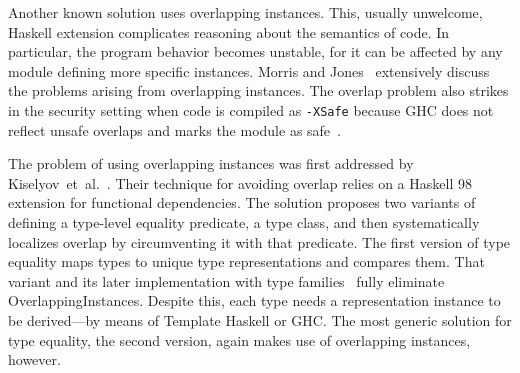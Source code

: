 \documentclass[runningheads]{llncs}
\newcommand{\K}[1]{\lstinline[style=fancy]{#1}}
\begin{document}
Another known solution uses overlapping instances. This, usually unwelcome, Haskell extension complicates reasoning about the semantics of code. In particular, the program behavior becomes unstable, for it can be affected by any module defining more specific instances. Morris and Jones~\cite{Morris2010} extensively discuss the problems arising from overlapping instances.
The overlap problem also strikes in the security setting when code is compiled as \K{-XSafe} because GHC does not reflect unsafe overlaps and marks the module as safe~\cite{sh-overlapping}.

The problem of using overlapping instances was first addressed by Kiselyov~et~al.~\cite{Kiselyov2004}. Their technique for avoiding overlap relies on a Haskell 98 extension for functional dependencies. The solution proposes two variants of defining a type-level equality predicate, a type class, and then systematically localizes overlap by circumventing it with that predicate. The first version of type equality maps types to unique type representations and compares them. That variant and its later implementation with type families~\cite{Kiselyov2012} fully eliminate \textsf{OverlappingInstances}. Despite this, each type needs a representation instance to be derived---by means of Template Haskell or GHC. The most generic solution for type equality, the second version, again makes use of overlapping instances, however.
\end{document}
